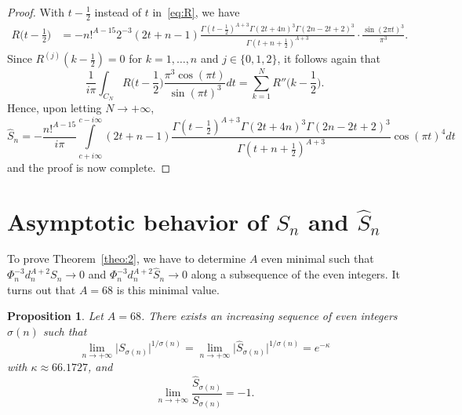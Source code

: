 \documentclass[reqno,12pt]{article}
\newtheorem{prop}{Proposition}
\theoremstyle{remark}
\begin{document}
\begin{proof}
With $t-\frac12$ instead of $t$ in~\eqref{eq:R}, we have
\begin{align*}
R\Big(t-\frac12\Big)
&=-n!^{A-15}2^{-3} (2t+n-1)\frac{\Gamma(t-\frac12)^{A+3}\Gamma(2t+4n)^3\Gamma(2n-2t+2)^3}{\Gamma(t+n+\frac12)^{A+3}}\cdot\frac{\sin(2\pi t)^3}{\pi^3}.
\end{align*}
Since $R^{(j)}(k-\frac12)=0$ for $k=1, \ldots, n$ and $j\in\{0,1,2\}$, it follows again that
$$
\frac{1}{i\pi}\int_{C_N} R\Big(t-\frac12\Big) \frac{\pi^3 \cos(\pi t)}{\sin(\pi t)^3}dt = \sum_{k=1}^N R''\Big(k-\frac12\Big).
$$ 
Hence, upon letting $N\to +\infty$, 
$$
\widehat{S}_n=-\frac{n!^{A-15}}{i\pi}\int\limits_{c+i\infty}^{c-i\infty} (2t+n-1)\frac{\Gamma(t-\frac{1}{2})^{A+3}\Gamma(2t+4n)^3\Gamma(2n-2t+2)^3}{\Gamma(t+n+\frac12)^{A+3}}\cos(\pi t)^4dt
$$
and the proof is now complete.
\end{proof}

\section{Asymptotic behavior of $S_n$ and $\widehat{S}_n$}\label{sec:4}

To prove Theorem~\ref{theo:2}, we have to  determine $A$ even minimal such that $\Phi_{n}^{-3}d_{n}^{A+2}S_{n}\to 0$ and $\Phi_{n}^{-3}d_{n}^{A+2}\widehat{S}_{n}\to 0$ along a subsequence of the even integers. It turns out that $A=68$ is this minimal value. 

\begin{prop} \label{prop:3} Let $A=68$. There exists an increasing sequence of even integers $\sigma(n)$ such that 
$$
\lim_{n\to +\infty} \vert S_{\sigma(n)}\vert^{1/\sigma(n)}= 
\lim_{n\to +\infty} \vert \widehat{S}_{\sigma(n)}\vert^{1/\sigma(n)}= e^{-\kappa}
$$
with $\kappa \approx 66.1727$, 
and 
$$
\lim_{n\to +\infty} \frac{\widehat{S}_{\sigma(n)}}{S_{\sigma(n)}}=-1.
$$
\end{prop}
\end{document}
